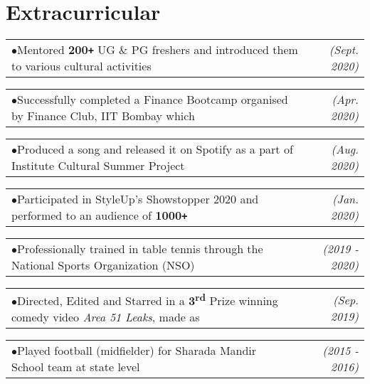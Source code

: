 \documentclass[a4paper,11pt]{article}
\makeatletter
\def\Plus{\texttt{+}}
\newcommand{\resumeItemAlt}[2]{
    \begin{tabular*}{0.977\textwidth}{l@{\extracolsep{\fill}}r}
        \tiny{$\bullet$}\hspace{7pt}\small{#1} & \textit{\footnotesize #2} \\
    \end{tabular*}
}
\newcommand{\resumeItemAltListStart}{\begin{adjustwidth}{10.8pt}{}}
\newcommand{\resumeItemAltListEnd}{\end{adjustwidth}}
\makeatother
\begin{document}
\section{Extracurricular}
\resumeItemAltListStart
	\resumeItemAlt
    {Mentored \textbf{200\Plus} UG \& PG freshers and introduced them to various cultural activities}
    {(Sept. 2020)}  
	\resumeItemAlt
    {Successfully completed a Finance Bootcamp organised by Finance Club, IIT Bombay which}
    {(Apr. 2020)}
	\vspace{-2pt} \hspace{3.75mm}{\small taught and tested the knowledge of Financial Statements, Capital Markets \& Ratio Analysis}\vspace{2pt}
	\resumeItemAlt
    {Produced a song and released it on Spotify as a part of Institute Cultural Summer Project}
    {(Aug. 2020)}
	\resumeItemAlt
    {Participated in StyleUp's Showstopper 2020 and performed to an audience of \textbf{1000\Plus}}
    {(Jan. 2020)}
	\resumeItemAlt
    {Professionally trained in table tennis through the National Sports Organization (NSO)}
    {(2019 - 2020)}
	\resumeItemAlt
    {Directed, Edited and Starred in a \textbf{3\textsuperscript{rd}} Prize winning comedy video \textit{Area 51 Leaks}, made as}
    {(Sep. 2019)}
	  \vspace{-2pt} \hspace{3.75mm}{an entry for the freshmen festival (Freshiezza)}\vspace{2pt}
	\resumeItemAlt
    {Played football (midfielder) for Sharada Mandir School team at state level}
    {(2015 - 2016)}
\resumeItemAltListEnd
\end{document}
